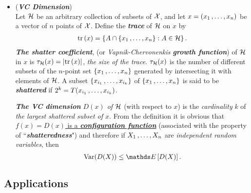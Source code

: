 \documentclass[11pt]{article}
\begin{document}
\begin{itemize}
\begin{proof}
On the other hand, assume that $X = k$ and let $\set{Z_{i_1} \xdotx{,} Z_{i_k}} \subset \set{Z_1 \xdotx{,} Z_n}$ be a sub-sequence of cardinality $k$ such that $f_k(Z_{i_1} \xdotx{,} Z_{i_k}) = k$. (Note that by \emph{the definition of a configuration function} such \emph{a sub-sequence exists}.) Clearly, if the index $i$ is such that $i \not\in \set{i_1 \xdotx{,} i_k}$ then $X = X_i$, and therefore
\begin{align*}
\sum_{i=1}^{n}\paren{X - X_i} \le X
\end{align*}
is also satisfied, which concludes the proof. \qed
\end{proof}

\item \begin{example} (\emph{\textbf{VC Dimension}})\\
Let ${\mathcal H}$ be an arbitrary collection of subsets of ${\mathcal X}$, and let $x = (x_1 \,{,}\ldots{,}\, x_n)$ be a vector of $n$ points of ${\mathcal X}$. Define the \emph{\textbf{trace}} of ${\mathcal H}$ on $x$ by
\begin{align*}
\mathrm{tr}\left(x \right) = \left\{A \cap \left\{x_1 \,{,}\ldots{,}\, x_n\right\}: A \in {\mathcal H}\right\}.
\end{align*}
\emph{\textbf{The shatter coefficient}}, (or \emph{Vapnik-Chervonenkis \textbf{growth function}}) of ${\mathcal H}$ in $x$ is $\tau_{{\mathcal H}}(x) = \left\lvert \mathrm{tr}\left(x \right) \right\rvert$, \emph{the size of the trace}. $\tau_{{\mathcal H}}(x)$ is the number of different subsets of the $n$-point set $\left\{x_1 \,{,}\ldots{,}\, x_n\right\}$ generated by intersecting it with elements of ${\mathcal H}$. A subset
$\left\{x_{i_1} \,{,}\ldots{,}\, x_{i_k}\right\}$ of $\left\{x_1 \,{,}\ldots{,}\, x_n\right\}$ is said to be \emph{\textbf{shattered}} if $2^k = T(x_{i_1} \,{,}\ldots{,}\, x_{i_k})$. 

\emph{\textbf{The VC dimension} $D(x)$ of ${\mathcal H}$} (with respect to $x$) is the \emph{cardinality} $k$ of \emph{the largest shattered subset of $x$}. From the definition it is obvious that \underline{$f(x) = D(x)$ is a \emph{\textbf{configuration function}}} (associated with the property of ``\emph{\textbf{shatteredness}}") and therefore if $X_1 \,{,}\ldots{,}\, X_n$ are \emph{independent random variables}, then
\begin{align*}
\text{Var}(D(X)) \le \E{}{D(X)}.
\end{align*}
\end{example}
\end{itemize}

\subsection{Applications}
\end{document}
